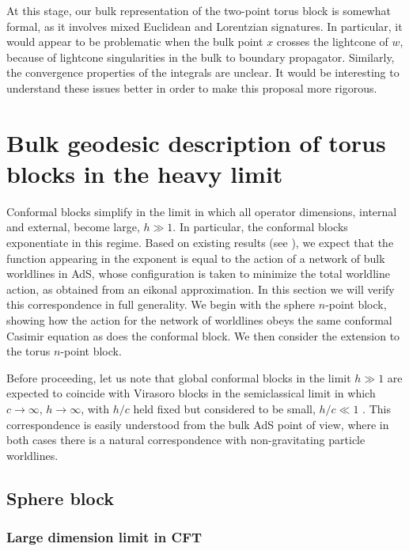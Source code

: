 \documentclass[12pt]{article}
\begin{document}
At this stage, our bulk representation of the two-point torus block is somewhat formal, as it involves mixed Euclidean and Lorentzian signatures. In particular, it would appear to be problematic when the bulk point $x$ crosses the lightcone of $w$, because of lightcone singularities in the bulk to boundary propagator.  Similarly, the convergence properties of the integrals are unclear. It would be interesting to understand these issues better in order to make this proposal more rigorous.


\section{Bulk geodesic description of torus blocks in the heavy limit}


Conformal blocks simplify in the limit in which all operator dimensions, internal and external, become large, $h \gg 1$.  In particular, the conformal blocks exponentiate in this regime.  Based on existing results (see \cite{Hijano:2015zsa}), we expect that the function appearing in the exponent is equal to the action of a network of bulk worldlines in AdS, whose configuration is taken to minimize the total worldline action, as obtained from an eikonal approximation. In this section we will verify this correspondence in full generality.
We begin with the sphere $n$-point block, showing how the action for the network of worldlines obeys the same conformal Casimir equation as does the conformal block.   We then consider the extension to the torus $n$-point block.

Before proceeding, let us note that global conformal blocks in the limit $h \gg 1$ are expected to coincide with Virasoro blocks in the semiclassical limit in which $ c \rightarrow \infty$, $h\rightarrow \infty$, with $h/c$ held fixed but considered to be small, $h/c \ll 1$ \cite{Fitzpatrick:2015zha}.  This correspondence is easily understood from the bulk AdS point of view, where in both cases there is a natural correspondence with non-gravitating particle worldlines.

\subsection{Sphere block}

\subsubsection{Large dimension limit in CFT}
\end{document}
